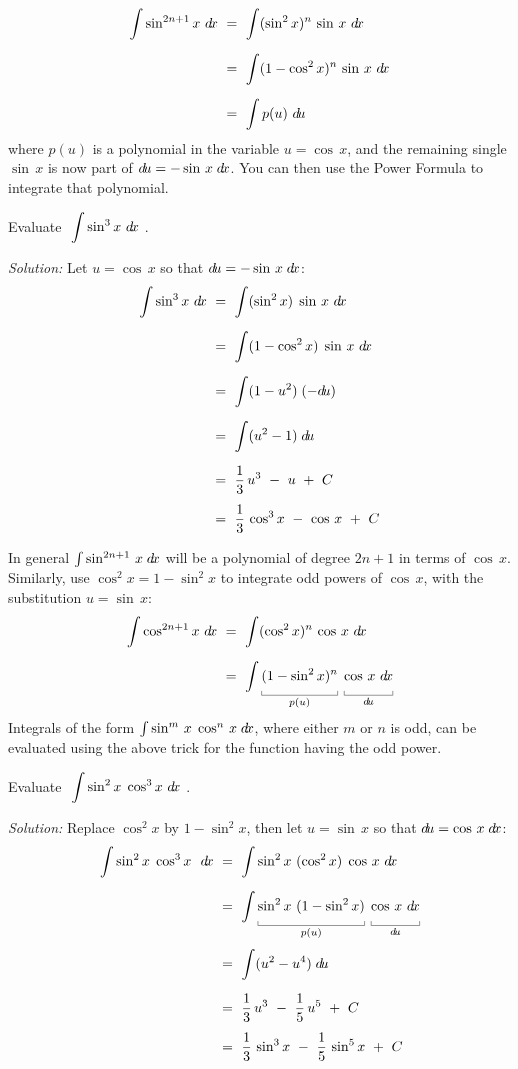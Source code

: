 \begin{align*}
\int \sin^{2n+1} x~d\!x ~&=~ \int (\sin^2 x)^n \,\sin\,x~d\!x\\[6pt]
&=~ \int (1 - \cos^2 x)^n \,\sin\,x~d\!x\\[6pt]
&=~ \int p(u)~d\!u
\end{align*}
where $p(u)$ is a polynomial in the variable $u=\cos\,x$, and the remaining
single $\sin\,x$ is now part of $d\!u = -\sin\,x\;d\!x$. You can then use the
Power Formula to integrate that polynomial.

\begin{exmp}\label{exmp:trigint2}
\noindent Evaluate $~\displaystyle\int \sin^3 x~d\!x~$.\vspace{1mm}
\par\noindent\emph{Solution:} Let $u=\cos\,x$ so that $d\!u=-\sin\,x\;d\!x$:
\begin{align*}
\int \sin^3 x~d\!x ~&=~ \int (\sin^2 x) \;\sin\,x~d\!x\\[6pt]
&=~ \int (1 - \cos^2 x) \;\sin\,x~d\!x\\[6pt]
&=~ \int (1 - u^2)\;(-d\!u)\\[6pt]
&=~ \int (u^2 - 1)\;d\!u\\[6pt]
&=~ \frac{1}{3}\,u^3 ~-~ u ~+~ C\\[4pt]
&=~ \frac{1}{3}\,\cos^3 x ~-~ \cos\,x ~+~ C
\end{align*}
\end{exmp}
\divider
\vspace{2mm}
In general $\int \sin^{2n+1}\,x\;d\!x$ will be a polynomial of degree $2n+1$ in
terms of $\cos\,x$. Similarly, use $\cos^2 x = 1 - \sin^2 x$ to integrate odd
powers of $\cos\,x$, with the substitution $u=\sin\,x$:
\begin{align*}
\int \cos^{2n+1} x~\dx ~&=~ \int (\cos^2 x)^n \,\cos\,x~\dx\\[6pt]
&=~ \int \underbracket[0.3pt]{(1 - \sin^2 x)^n\vphantom{\frac{1}{2}}}_{p(u)}
\;\underbracket[0.3pt]{\cos\,x~\dx\vphantom{\frac{1}{2}}}_{\du}
\end{align*}
\newpage
Integrals of the form $\int \sin^m\,x\;\cos^n\,x\;d\!x$, where either $m$ or
$n$ is odd, can be evaluated using the above trick for the function having the
odd power.
\begin{exmp}\label{exmp:trigint3}
\noindent Evaluate $~\displaystyle\int \sin^2 x\;\cos^3 x~d\!x~$.\vspace{1mm}
\par\noindent\emph{Solution:} Replace $\cos^2 x$ by $1 - \sin^2 x$, then let
$u=\sin\,x$ so that $d\!u=\cos\,x\;d\!x$:
\begin{align*}
\int \sin^2 x\;\cos^3 x~~\dx ~&=~ \int \sin^2 x ~(\cos^2 x) \;\cos\,x~\dx\\[6pt]
&=~ \int \underbracket[0.3pt]{\sin^2 x ~(1 - \sin^2 x)\vphantom{\frac{1}{2}}}_{p(u)}
    \;\underbracket[0.3pt]{\cos\,x~\dx\vphantom{\frac{1}{2}}}_{\du}\\[3pt]
&=~ \int (u^2 - u^4)\;\du\\[6pt]
&=~ \frac{1}{3}\,u^3 ~-~ \frac{1}{5}\,u^5 ~+~ C\\[4pt]
&=~ \frac{1}{3}\,\sin^3 x ~-~ \frac{1}{5}\,\sin^5 x ~+~ C
\end{align*}
\end{exmp}
